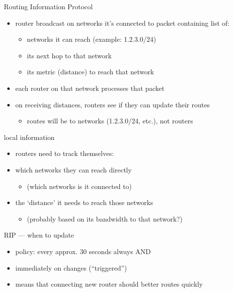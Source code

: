 \begin{frame}{Routing Information Protocol}
\begin{itemize}
\item router broadcast on networks it's connected to packet containing list of:
    \begin{itemize}
    \item networks it can reach (example: 1.2.3.0/24)
    \item its next hop to that network
    \item its metric (distance) to reach that network
    \end{itemize}
\item each router on that network processes that packet
\item on receiving distances, routers see if they can update their routes
    \begin{itemize}
    \item routes will be to networks (1.2.3.0/24, etc.), not routers
    \end{itemize}
\end{itemize}
\end{frame}

\begin{frame}{local information}
    \begin{itemize}
    \item routers need to track themselves:
    \vspace{.5cm}
    \item which networks they can reach directly
        \begin{itemize}
        \item (which networks is it connected to)
        \end{itemize}
    \item the `distance' it needs to reach those networks
        \begin{itemize}
        \item (probably based on its bandwidth to that network?)
        \end{itemize}
    \end{itemize}
\end{frame}

\begin{frame}{RIP --- when to update}
    \begin{itemize}
    \item policy: every approx. 30 seconds always AND
    \item immediately on changes (``triggered'')
    \vspace{.5cm}
    \item means that connecting new router should better routes quickly
    \end{itemize}
\end{frame}
